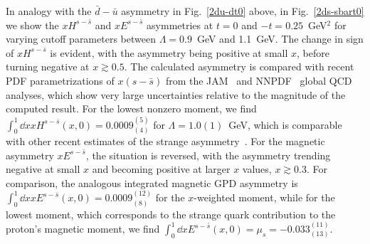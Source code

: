\documentclass[preprintnumbers,prd,superscriptaddress,preprint]{revtex4-1}
\begin{document}


In analogy with the $\bar{d}-\bar{u}$ asymmetry in Fig.~\ref{2du-dt0} above, in Fig.~\ref{2ds-sbart0} we show the $xH^{s-\bar{s}}$ and $xE^{s-\bar{s}}$ asymmetries at $t=0$ and $-t=0.25$~GeV$^2$ for varying cutoff parameters between $\Lambda=0.9$~GeV and 1.1~GeV.
The change in sign of $xH^{s-\bar{s}}$ is evident, with the asymmetry being positive at small $x$, before turning negative at $x \gtrsim 0.5$.
The calculated asymmetry is compared with recent PDF parametrizations of $x(s-\bar s)$ from the JAM~\cite{Cocuzza:2021cbi} and NNPDF~\cite{Faura:2020oom} global QCD analyses, which show very large uncertainties relative to the magnitude of the computed result.
For the lowest nonzero moment, we find 
    $\int_0^1 \dd{x} xH^{s-\bar{s}}(x,0) = 0.0009^{(5)}_{(4)}$
for $\Lambda=1.0(1)$~GeV, which is comparable with other recent estimates of the strange asymmetry~\cite{Bentz:2009yy, Wang:2016ndh, Salamu:2019dok}.
%
For the magnetic asymmetry $xE^{s-\bar{s}}$, the situation is reversed, with the asymmetry trending negative at small $x$ and becoming positive at larger $x$ values, $x \gtrsim 0.3$.
For comparison, the analogous integrated magnetic GPD asymmetry is
    $\int_0^1 \dd{x} xE^{s-\bar{s}}(x,0) = 0.0009^{(12)}_{(8)}$
for the $x$-weighted moment, while for the lowest moment, which corresponds to the strange quark contribution to the proton's magnetic moment, we find
    $\int_0^1 \dd{x} E^{s-\bar{s}}(x,0) = \mu_s = -0.033^{(11)}_{(13)}$.
\end{document}
